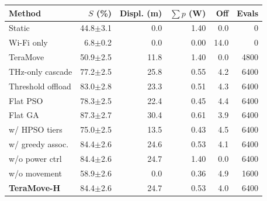 \begin{tabular}{@{}lrrrrr@{}}
\toprule
Method & $S$ (\%) & Displ. (m) & $\sum p$ (W) & Off & Evals \\
\midrule
Static & 44.8$\pm$3.1 & 0.0 & 1.40 & 0.0 & 0 \\
Wi-Fi only & 6.8$\pm$0.2 & 0.0 & 0.00 & 14.0 & 0 \\
TeraMove & 50.9$\pm$2.5 & 11.8 & 1.40 & 0.0 & 4800 \\
THz-only cascade & 77.2$\pm$2.5 & 25.8 & 0.55 & 4.2 & 6400 \\
Threshold offload & 83.0$\pm$2.8 & 23.3 & 0.51 & 4.3 & 6400 \\
Flat PSO & 78.3$\pm$2.5 & 22.4 & 0.45 & 4.4 & 6400 \\
Flat GA & 87.3$\pm$2.7 & 30.4 & 0.61 & 3.9 & 6400 \\
\midrule
w/ HPSO tiers & 75.0$\pm$2.5 & 13.5 & 0.43 & 4.5 & 6400 \\
w/ greedy assoc. & 84.4$\pm$2.6 & 24.6 & 0.53 & 4.1 & 6400 \\
w/o power ctrl & 84.4$\pm$2.6 & 24.7 & 1.40 & 0.0 & 6400 \\
w/o movement & 58.9$\pm$2.6 & 0.0 & 0.36 & 4.9 & 1600 \\
\textbf{TeraMove-H} & 84.4$\pm$2.6 & 24.7 & 0.53 & 4.0 & 6400 \\
\bottomrule
\end{tabular}

